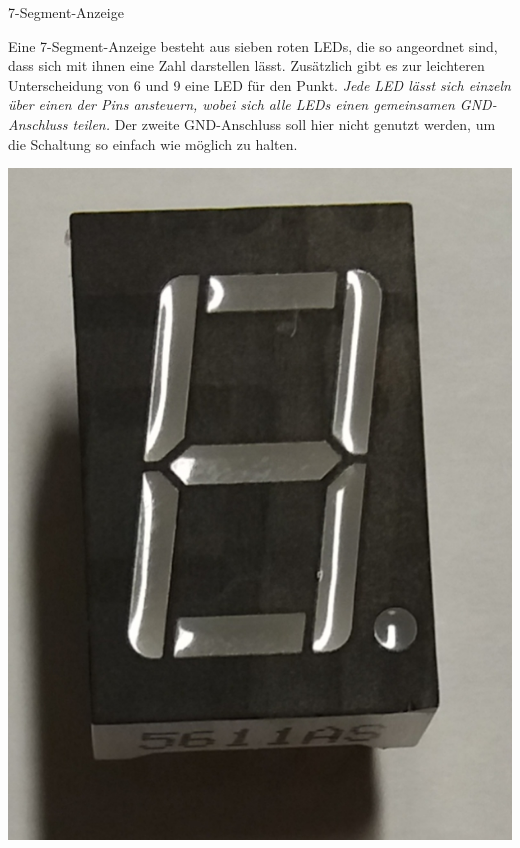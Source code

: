 \begin{zsfg}{7-Segment-Anzeige}
	\begin{minipage}{0.58\textwidth}
		Eine 7-Segment-Anzeige besteht aus sieben roten LEDs, die so angeordnet sind, dass sich mit ihnen eine Zahl darstellen lässt. Zusätzlich gibt es  zur leichteren Unterscheidung von 6 und 9 eine LED für den Punkt. \emph{Jede LED lässt sich einzeln über einen der Pins ansteuern, wobei sich alle LEDs einen gemeinsamen GND-Anschluss teilen.} Der zweite GND-Anschluss soll hier nicht genutzt werden, um die Schaltung so einfach wie möglich zu halten.
		
		\vspace{2\baselineskip}
	\end{minipage}
	\hfill
	\begin{minipage}{0.4\textwidth}
		\hfill
		\begin{minipage}{0.48\textwidth}
			\includegraphics[width=\textwidth]{./pics/7segmentanzeige-bild2.jpg}

\end{minipage}
\end{minipage}
\end{zsfg}
